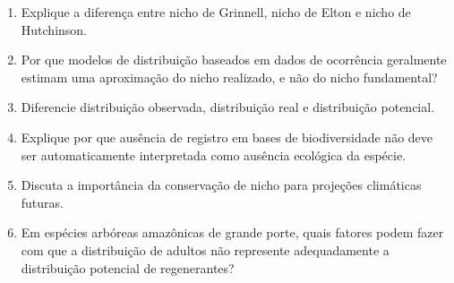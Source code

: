 \begin{exercicios}
\begin{enumerate}
  \item Explique a diferença entre nicho de Grinnell, nicho de Elton e nicho de Hutchinson.
  \item Por que modelos de distribuição baseados em dados de ocorrência geralmente estimam uma aproximação do nicho realizado, e não do nicho fundamental?
  \item Diferencie distribuição observada, distribuição real e distribuição potencial.
  \item Explique por que ausência de registro em bases de biodiversidade não deve ser automaticamente interpretada como ausência ecológica da espécie.
  \item Discuta a importância da conservação de nicho para projeções climáticas futuras.
  \item Em espécies arbóreas amazônicas de grande porte, quais fatores podem fazer com que a distribuição de adultos não represente adequadamente a distribuição potencial de regenerantes?
\end{enumerate}
\end{exercicios}


